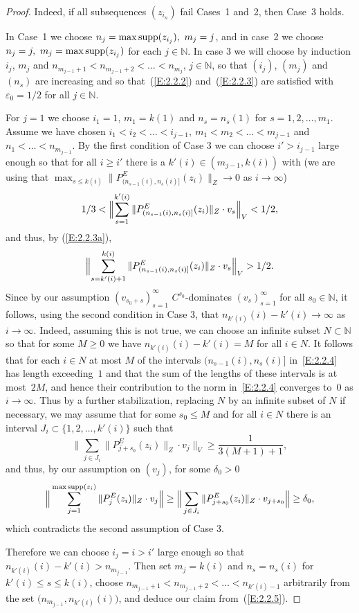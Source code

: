 \documentclass[11pt,leqno]{amsart}
\theoremstyle{definition}
\newcommand{\N}{\mathbb{N}}
\newcommand{\vp}{\varepsilon}
\newcommand{\supp}{{\rm supp}}
\begin{document}
\begin{proof}
\noindent
Indeed, if all subsequences $(z_{i_n})$ fail Cases~1 and~2, then Case~3
holds.

In Case~1 we choose $n_j=\max\supp(z_{i_j}),\ m_j=j$, and in case~2 we
choose $n_j=j,\ m_j=\max\supp(z_{i_j})$ for each $j\in\N$. In case 3
we will choose by induction $i_j$, $m_j$ and $n_{m_{j-1}+1}<
n_{m_{j-1}+2}< \ldots <n_{m_j}$, $j\in\N$, so that $(i_j)$, $(m_j)$
and $(n_s)$ are increasing and so that~(\ref{E:2.2.2})
and~(\ref{E:2.2.3})  are satisfied with $\vp_0=1/2$  for  all
$j\in\N$.

For $j=1$ we choose $i_1=1$, $m_1=k(1)$ and $n_s=n_s(1)$ for
$s=1,2,\ldots, m_1$.
Assume we have chosen $i_1<i_2<\ldots<i_{j-1},\
m_1<m_2<\ldots<m_{j-1}$ and $n_1<\ldots< n_{ m_{j-1}}$.  By the
first condition of Case 3 we can choose $i'>i_{j-1}$ large enough so
that for all  $i\ge i'$ there is a $k'(i)\in (m_{j-1},k(i))$ with (we
are using that $\max_{s\le k(i)} \|P^E_{(n_{s-1}(i),n_s(i)]}
  (z_i)\|_Z\to 0$ as $i\to\infty$)
\begin{equation}\label{E:2.2.4}
1/3<
\Bigl\|\sum_{s=1}^{k'(i)}\|
P^E_{(n_{s-1}{(i)},n_s{(i)}]}(z_i)\|_Z\cdot v_{s}\Big\|_V<1/2,
\end{equation}
and thus, by (\ref{E:2.2.3a}),
\begin{equation}\label{E:2.2.5}
\Bigl\|\sum_{s=k'(i)+1}^{k(i)}
 \| P^E_{(n_{s-1}{(i)},n_s{(i)}]}(z_i)\|_Z \cdot v_{s}\Big\|_V>1/2.
\end{equation}
Since by our assumption $(v_{s_0+s})_{s=1}^\infty$ $C^{s_0}$-dominates
$(v_s)_{s=1}^\infty$ for all $s_0\in\N$, it follows, using the second
condition in Case 3, that $n_{k'(i)}(i)-k'(i)\to\infty$ as $i\to\infty$.
Indeed, assuming this is not true, we can choose an infinite subset
$N\subset\N$ so that
for some $M\ge 0$ we have $n_{k'(i)}(i)-k'(i)=M$ for all $i\in N$. It
follows that for each $i\in N$ at most $M$ of the intervals
$(n_{s-1}(i),n_s(i)]$ in~\eqref{E:2.2.4} has length
exceeding~$1$ and that the sum of the lengths of these intervals is at
most~$2M$, and hence their contribution to the norm
in~\eqref{E:2.2.4} converges to~$0$ as $i\to\infty$. Thus by a further
stabilization, replacing $N$ by an infinite subset of $N$ if
necessary, we may assume that for some $s_0\le M$ and for all $i\in N$
there is an interval $J_i\subset\{1,2,\ldots,k'(i)\}$ such that
$$\Big\|\sum_{j\in J_i} \|P^E_{j+s_0}(z_i)\|_Z\cdot
v_j\Big\|_V\ge \frac1{3(M+1)+1},$$
and thus, by our assumption on $(v_j)$, for some $\delta_0>0$
$$
\Big\|\sum_{j=1}^{\max \supp (z_i)} \|P^E_j(z_i)\|_Z\cdot
v_{j}\Big\|\geq 
\Big\|\sum_{j\in J_i} \|P^E_{j+s_0}(z_i)\|_Z\cdot v_{j+s_0}\Big\|\ge
\delta_0,$$
which contradicts the second assumption of Case 3.

Therefore we can choose $i_j=i>i'$ large enough so that
$n_{k'(i)}(i)-k'(i)>n_{m_{j-1}}$. Then set $m_j=k(i)$ and $n_s=n_s(i)$
for $k'(i)\leq s\leq k(i)$, choose
$n_{m_{j-1}+1}<n_{m_{j-1}+2}<\ldots< n_{k'(i)-1}$ arbitrarily from the
set $\big(n_{m_{j-1}},n_{k'(i)}(i)\big)$, and deduce our claim
from~(\ref{E:2.2.5}).
\end{proof}
\end{document}
